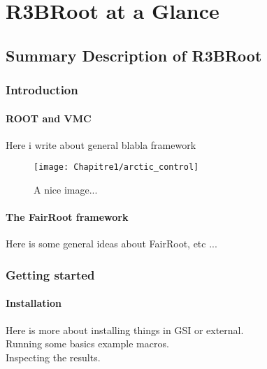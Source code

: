 \part{ R3BRoot at a Glance }
\chapter{Summary Description of R3BRoot }
\label{chap:intro}
\minitoc

\section{ Introduction}

\subsection{ ROOT and VMC  }

Here i write about general blabla framework

\begin{figure}[!htbp]
  \begin{center}
    \texttt{[image: Chapitre1/arctic\_control]}
  \end{center}
  \caption{A nice image...}
  \label{fig:jolieImage}
\end{figure}

\subsection{ The FairRoot framework }

Here is some general ideas about FairRoot, etc ... 


\section{Getting started}

\subsection{ Installation }

Here is more about installing things in GSI 
or external. \\
Running some basics example macros. \\  
Inspecting the results. \\



